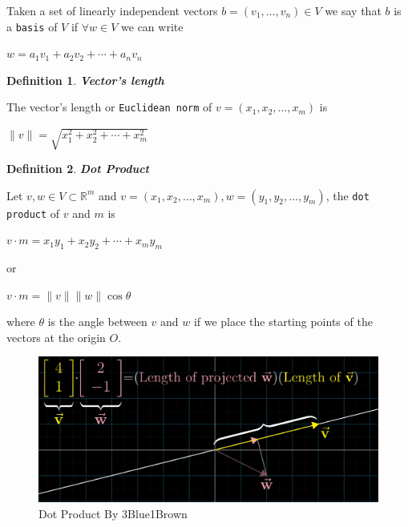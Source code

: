 \documentclass[a4paper,12pt]{report}
\newtheorem{definition}{Definition}[section]
\newcommand{\R}{\mathbb{R}}
\newcommand{\dd}{\cdot}
\begin{document}
Taken a set of linearly independent vectors $b = (v_1,\ldots,v_n) \in V$ we say that $b$ is a \texttt{basis} of $V$ if $\forall w \in V$ we can write

\begin{center}
    $w = a_1v_1 + a_2v_2 + \cdots + a_nv_n$
\end{center}

\begin{definition}
    \textbf{Vector's length}
\end{definition}

The vector's length or \texttt{Euclidean norm} of $v = (x_1, x_2, \ldots, x_m)$ is

\begin{center}
    $\lVert v \rVert = \sqrt{x_1^2 + x_2^2 + \cdots + x_m^2}$
\end{center}

\begin{definition}
    \textbf{Dot Product}
\end{definition}

Let $v, w \in V \subset \R^m$ and $v = (x_1, x_2, \ldots, x_m), w = (y_1, y_2, \ldots, y_m)$, the \texttt{dot product} of $v$ and $m$ is

\begin{center}
    $v \dd m = x_1y_1 + x_2y_2 + \cdots + x_my_m$

    or

    $v \dd m = \lVert v \rVert \lVert w \rVert \cos{\theta}$
\end{center}

where $\theta$ is the angle between $v$ and $w$ if we place the starting points of the vectors at the origin $O$.

\begin{figure}[!b]
    \centering
    \includegraphics[scale=0.2]{./img/dot_product.png}
    \caption{Dot Product By 3Blue1Brown}
    \label{fig:dot_product}
\end{figure}
\end{document}
